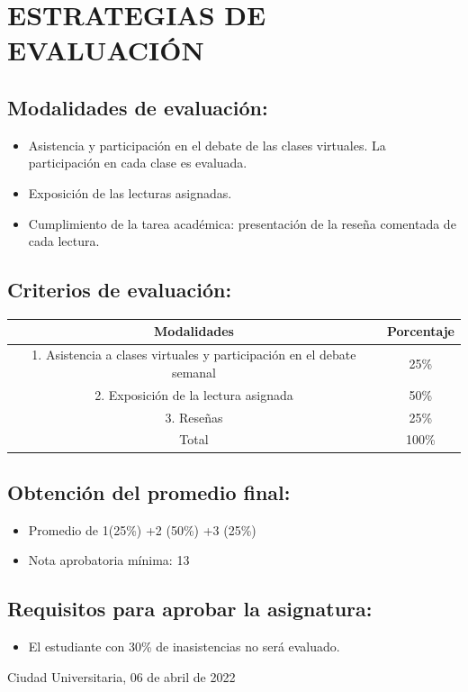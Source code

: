 \documentclass[a4paper]{article}
\begin{document}
\section {ESTRATEGIAS DE EVALUACIÓN}
\subsection {Modalidades de evaluación:}
\begin{itemize}
\item Asistencia y participación en el debate de las clases virtuales. La participación en cada clase es evaluada.
\item Exposición de las lecturas asignadas.
\item Cumplimiento de la tarea académica: presentación de la reseña comentada de cada lectura.
\end{itemize}
\subsection {Criterios de evaluación:}
\begin{table}[ht]
\centering
\begin{tabular}{|c|c|}
\hline
\textbf{Modalidades} & \textbf{Porcentaje} \\ 
\hline
1. Asistencia a clases virtuales y participación en el debate semanal & 25\% \\ 
\hline
2. Exposición de la lectura asignada & 50\% \\ 
\hline
3. Reseñas & 25\% \\ 
\hline
Total & 100\% \\ 
\hline 
\end{tabular}
\end{table}
\subsection {Obtención del promedio final:}
\begin{itemize}
\item Promedio de 1(25\%) +2 (50\%) +3 (25\%)
\item Nota aprobatoria mínima: 13
\end{itemize}
\subsection {Requisitos para aprobar la asignatura:}
\begin{itemize}
\item El estudiante con 30\% de inasistencias no será evaluado.
\end{itemize}
\begin{flushright}
Ciudad Universitaria, 06 de abril de 2022
\end{flushright}
\end{document}
